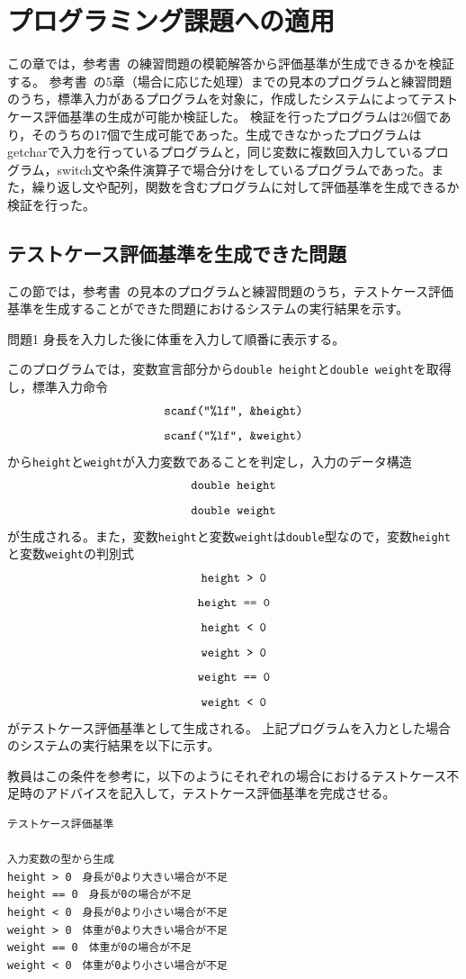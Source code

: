 \documentclass{tpu-sotu}
\begin{document}
\chapter{プログラミング課題への適用}
この章では，参考書~\cite{b1}の練習問題の模範解答から評価基準が生成できるかを検証する。
参考書~\cite{b1}の5章（場合に応じた処理）までの見本のプログラムと練習問題のうち，標準入力があるプログラムを対象に，作成したシステムによってテストケース評価基準の生成が可能か検証した。
検証を行ったプログラムは26個であり，そのうちの17個で生成可能であった。生成できなかったプログラムはgetcharで入力を行っているプログラムと，同じ変数に複数回入力しているプログラム，switch文や条件演算子で場合分けをしているプログラムであった。また，繰り返し文や配列，関数を含むプログラムに対して評価基準を生成できるか検証を行った。

\section{テストケース評価基準を生成できた問題}
この節では，参考書~\cite{b1}の見本のプログラムと練習問題のうち，テストケース評価基準を生成することができた問題におけるシステムの実行結果を示す。
\begin{itembox}[l]{問題1}
身長を入力した後に体重を入力して順番に表示する。
\end{itembox}

このプログラムでは，変数宣言部分から{\tt double height}と{\tt double weight}を取得し，標準入力命令\\
\[ 
\mbox{{\tt {scanf("\%lf", \&height)}}}
\]
\[ 
\mbox{{\tt {scanf("\%lf", \&weight)}}}
\]
から{\tt height}と{\tt weight}が入力変数であることを判定し，入力のデータ構造\\
\[
\mbox{{\tt double height}}
\]
\[
\mbox{{\tt double weight}}
\]
が生成される。また，変数{\tt height}と変数{\tt weight}は{\tt double}型なので，変数{\tt height}と変数{\tt weight}の判別式\\
\[ 
\mbox{\tt{height > 0}} 
\]
\[
\mbox{\tt{height == 0}}
\]
\[
\mbox{\tt{height < 0}}
\]
\[ 
\mbox{\tt{weight > 0}} 
\]
\[
\mbox{\tt{weight == 0}}
\]
\[
\mbox{\tt{weight < 0}}
\]
がテストケース評価基準として生成される。
上記プログラムを入力とした場合のシステムの実行結果を以下に示す。

教員はこの条件を参考に，以下のようにそれぞれの場合におけるテストケース不足時のアドバイスを記入して，テストケース評価基準を完成させる。
\begin{lstlisting}[xleftmargin=1cm]
テストケース評価基準

入力変数の型から生成
height > 0　身長が0より大きい場合が不足
height == 0　身長が0の場合が不足
height < 0　身長が0より小さい場合が不足
weight > 0　体重が0より大きい場合が不足
weight == 0　体重が0の場合が不足
weight < 0　体重が0より小さい場合が不足
\end{lstlisting}
\end{document}
